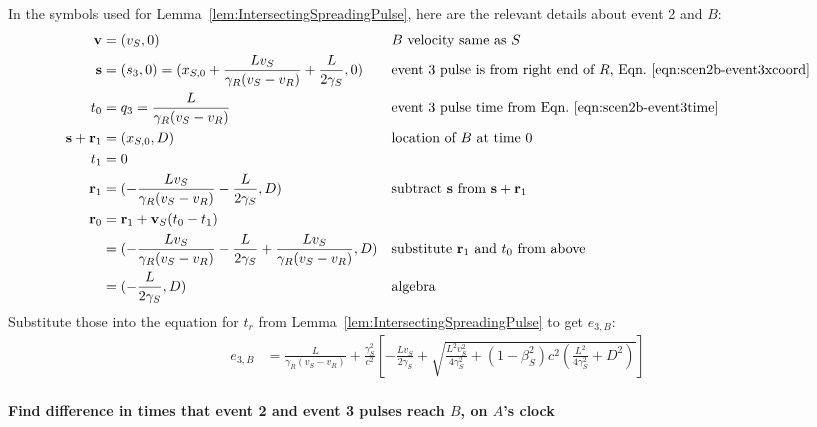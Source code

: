 \documentclass[a4paper]{article}
\theoremstyle{plain}
\theoremstyle{definition}
\newcommand{\vect}[1]{\mathbf{#1}}
\begin{document}
In the symbols used for Lemma~\ref{lem:IntersectingSpreadingPulse},
here are the relevant details about event 2 and $B$:
\begin{align*}
\vect{v} & = (v_S, 0) & & \text{$B$ velocity same as $S$} \\
\vect{s} & = (s_3,0) = (x_{S,0} + \frac{Lv_S}{\gamma_R(v_S - v_R)} + \frac{L}{2\gamma_S}, 0) & & \text{event 3 pulse is from right end of $R$, Eqn.~\eqref{eqn:scen2b-event3xcoord}} \\
t_0 & = q_3 = \frac{L}{\gamma_R(v_S - v_R)} & & \text{event 3 pulse time from Eqn.~\eqref{eqn:scen2b-event3time}} \\
\vect{s} + \vect{r}_1 & = (x_{S,0}, D) & & \text{location of $B$ at time 0} \\
t_1 & = 0 \\
\vect{r}_1 & = (-\frac{Lv_S}{\gamma_R(v_S - v_R)} - \frac{L}{2\gamma_S}, D) & & \text{subtract $\vect{s}$ from $\vect{s}+\vect{r}_1$} \\
\vect{r}_0
  & = \vect{r}_1 + \vect{v}_S(t_0-t_1) \\
  & = (-\frac{Lv_S}{\gamma_R(v_S - v_R)} - \frac{L}{2\gamma_S} + \frac{Lv_S}{\gamma_R(v_S - v_R)}, D) & & \text{substitute $\vect{r}_1$ and $t_0$ from above} \\
  & = (-\frac{L}{2\gamma_S}, D) & & \text{algebra}
\end{align*}
Substitute those into the equation for $t_r$ from
Lemma~\ref{lem:IntersectingSpreadingPulse} to get $e_{3,B}$:
\begin{align*}
e_{3,B} & = \frac{L}{\gamma_R(v_S - v_R)} + \frac{\gamma_S^2}{c^2} \left[ -\frac{Lv_S}{2\gamma_S} + \sqrt{\frac{L^2v_S^2}{4\gamma_S^2} + (1-\beta_S^2)c^2 (\frac{L^2}{4\gamma_S^2} + D^2)} \right]
\end{align*}


\paragraph{Find difference in times that event 2 and event 3 pulses reach $B$, on $A$'s clock}
\end{document}
